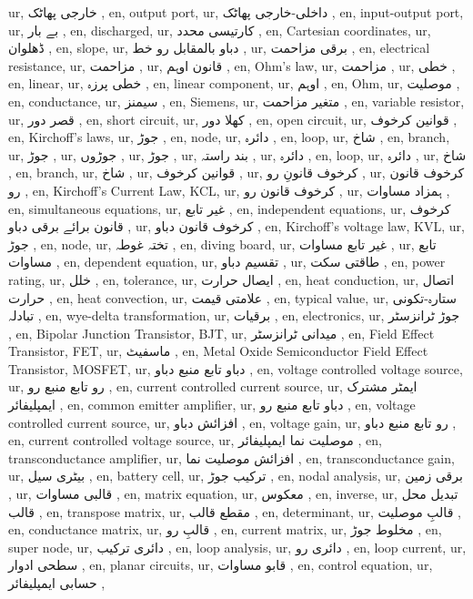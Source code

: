 ur, خارجی پھاٹک ,
en, output port,
ur, داخلی-خارجی پھاٹک ,
en, input-output port,
ur, بے بار ,
en, discharged,
ur, کارتیسی محدد ,
en, Cartesian coordinates,
ur, ڈھلوان ,
en, slope,
ur, دباو بالمقابل رو خط ,
ur, برقی مزاحمت ,
en, electrical resistance,
ur, مزاحمت ,
ur, قانون اوہم ,
en, Ohm's law,
ur, مزاحمت ,
ur, خطی ,
en, linear,
ur, خطی پرزہ ,
en, linear component,
ur, اوہم ,
en, Ohm,
ur, موصلیت ,
en, conductance,
ur, سیمنز ,
en, Siemens,
ur, متغیر مزاحمت ,
en, variable resistor,
ur, قصر دور ,
en, short circuit,
ur, کھلا دور ,
en, open circuit,
ur, قوانین کرخوف ,
en, Kirchoff's laws,
ur, جوڑ ,
en, node,
ur, دائرہ ,
en, loop,
ur, شاخ ,
en, branch,
ur, جوڑ ,
ur, جوڑوں ,
ur, جوڑ ,
ur, بند راستہ ,
ur, دائرہ ,
en, loop,
ur, دائرہ ,
ur, شاخ ,
en, branch,
ur, شاخ ,
ur, قوانین کرخوف ,
ur, کرخوف قانونِ رو ,
ur, کرخوف قانون رو ,
en, Kirchoff's Current Law, KCL,
ur, کرخوف قانون رو ,
ur, ہمزاد مساوات ,
en, simultaneous equations,
ur, غیر تابع ,
en, independent equations,
ur, کرخوف قانون برائے برقی دباو ,
ur, کرخوف قانون دباو ,
en, Kirchoff's voltage law, KVL,
ur, جوڑ ,
en, node,
ur, تختہ غوطہ ,
en, diving board,
ur, غیر تابع مساوات ,
ur, تابع مساوات ,
en, dependent equation,
ur, تقسیم دباو ,
ur, طاقتی سکت ,
en, power rating,
ur, خلل ,
en, tolerance,
ur, ایصال حرارت ,
en, heat conduction,
ur, اتصال حرارت ,
en, heat convection,
ur, علامتی قیمت ,
en, typical value,
ur, ستارہ-تکونی تبادلہ ,
en, wye-delta transformation,
ur, برقیات ,
en, electronics,
ur, جوڑ ٹرانزسٹر ,
en, Bipolar Junction Transistor, BJT,
ur, میدانی ٹرانزسٹر ,
en, Field Effect Transistor, FET,
ur, ماسفیٹ ,
en, Metal Oxide Semiconductor Field Effect Transistor, MOSFET,
ur, دباو تابع منبع دباو ,
en, voltage controlled voltage source,
ur, رو تابع منبع رو ,
en, current controlled current source,
ur, ایمٹر مشترک ایمپلیفائر ,
en, common emitter amplifier,
ur, دباو تابع منبع رو ,
en, voltage controlled current source,
ur, افزائش دباو ,
en, voltage gain,
ur, رو تابع منبع دباو ,
en, current controlled voltage source,
ur, موصلیت نما ایمپلیفائر ,
en, transconductance amplifier,
ur, افزائش موصلیت نما ,
en, transconductance gain,
ur, بیٹری سیل ,
en, battery cell,
ur, ترکیب جوڑ ,
en, nodal analysis,
ur, برقی زمین ,
ur, قالبی مساوات ,
en, matrix equation,
ur, معکوس ,
en, inverse,
ur, تبدیل محل قالب ,
en, transpose matrix,
ur, مقطع قالب ,
en, determinant,
ur, قالبِ موصلیت ,
en, conductance matrix,
ur, قالبِ رو ,
en, current matrix,
ur, مخلوط جوڑ ,
en, super node,
ur, دائری ترکیب ,
en, loop analysis,
ur, دائری رو ,
en, loop current,
ur, سطحی ادوار ,
en, planar circuits,
ur, قابو مساوات ,
en, control equation,
ur, حسابی ایمپلیفائر ,
